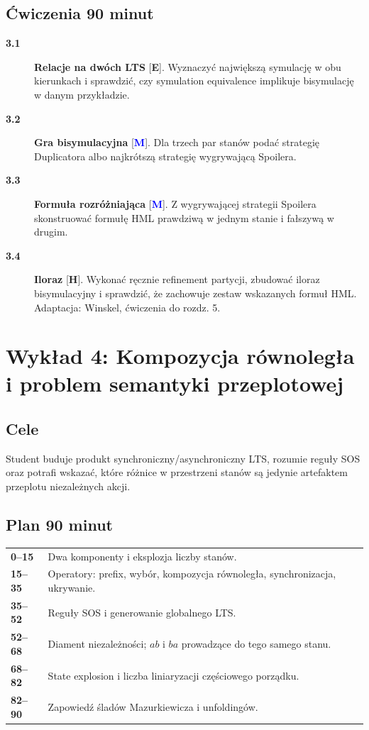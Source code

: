 \documentclass[11pt,a4paper]{article}
\newcommand{\E}{\textcolor{greenreview}{\textbf{E}}}
\newcommand{\M}{\textcolor{blue}{\textbf{M}}}
\newcommand{\Hard}{\textcolor{redreview}{\textbf{H}}}
\newcommand{\zad}[4]{\item[\textbf{#1}] \textbf{#2} [#3]. #4}
\begin{document}
\subsection{Ćwiczenia 90 minut}
\begin{description}
\zad{3.1}{Relacje na dwóch LTS}{\E}{Wyznaczyć największą symulację w obu kierunkach i sprawdzić, czy symulation equivalence implikuje bisymulację w danym przykładzie.}
\zad{3.2}{Gra bisymulacyjna}{\M}{Dla trzech par stanów podać strategię Duplicatora albo najkrótszą strategię wygrywającą Spoilera.}
\zad{3.3}{Formuła rozróżniająca}{\M}{Z wygrywającej strategii Spoilera skonstruować formułę HML prawdziwą w jednym stanie i fałszywą w drugim.}
\zad{3.4}{Iloraz}{\Hard}{Wykonać ręcznie refinement partycji, zbudować iloraz bisymulacyjny i sprawdzić, że zachowuje zestaw wskazanych formuł HML. Adaptacja: Winskel, ćwiczenia do rozdz. 5.}
\end{description}

\section{Wykład 4: Kompozycja równoległa i problem semantyki przeplotowej}

\subsection{Cele}
Student buduje produkt synchroniczny/asynchroniczny LTS, rozumie reguły SOS oraz potrafi wskazać, które różnice w przestrzeni stanów są jedynie artefaktem przeplotu niezależnych akcji.

\subsection{Plan 90 minut}
\begin{center}\small\begin{tabularx}{0.96\textwidth}{@{}>{\bfseries}p{18mm}X@{}}
0--15 & Dwa komponenty i eksplozja liczby stanów.\\
15--35 & Operatory: prefix, wybór, kompozycja równoległa, synchronizacja, ukrywanie.\\
35--52 & Reguły SOS i generowanie globalnego LTS.\\
52--68 & Diament niezależności; $ab$ i $ba$ prowadzące do tego samego stanu.\\
68--82 & State explosion i liczba liniaryzacji częściowego porządku.\\
82--90 & Zapowiedź śladów Mazurkiewicza i unfoldingów.\\
\end{tabularx}\end{center}
\end{document}
